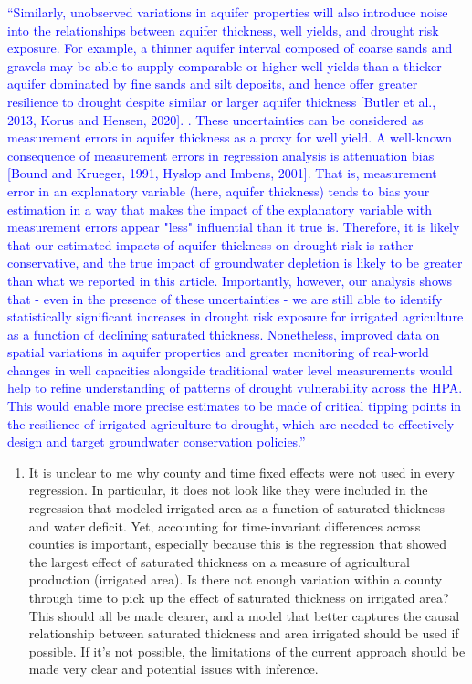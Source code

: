 \documentclass[
]{article}
\providecommand{\tightlist}{%
  \setlength{\itemsep}{0pt}\setlength{\parskip}{0pt}}
\begin{document}
\textcolor{blue}{``Similarly, unobserved variations in aquifer properties will also introduce noise into the relationships between aquifer thickness, well yields, and drought risk exposure. For example, a thinner aquifer interval composed of coarse sands and gravels may be able to supply comparable or higher well yields than a thicker aquifer dominated by fine sands and silt deposits, and hence offer greater resilience to drought despite similar or larger aquifer thickness [Butler et al., 2013, Korus and Hensen, 2020]. . These uncertainties can be considered as measurement errors in aquifer thickness as a proxy for well yield. A well-known consequence of measurement errors in regression analysis is attenuation bias [Bound and Krueger, 1991, Hyslop and Imbens, 2001]. That is, measurement error in an explanatory variable (here, aquifer thickness) tends to bias your estimation in a way that makes the impact of the explanatory variable with measurement errors appear "less" influential than it true is. Therefore, it is likely that our estimated impacts of aquifer thickness on drought risk is rather conservative, and the true impact of groundwater depletion is likely to be greater than what we reported in this article. Importantly, however, our analysis shows that - even in the presence of these uncertainties - we are still able to identify statistically significant increases in drought risk exposure for irrigated agriculture as a function of declining saturated thickness. Nonetheless, improved data on spatial variations in aquifer properties and greater monitoring of real-world changes in well capacities alongside traditional water level measurements would help to refine understanding of patterns of drought vulnerability across the HPA. This would enable more precise estimates to be made of critical tipping points in the resilience of irrigated agriculture to drought, which are needed to effectively design and target groundwater conservation policies.''}

\begin{enumerate}
\def\labelenumi{\arabic{enumi}.}
\setcounter{enumi}{2}
\tightlist
\item
  It is unclear to me why county and time fixed effects were not used in
  every regression. In particular, it does not look like they were
  included in the regression that modeled irrigated area as a function
  of saturated thickness and water deficit. Yet, accounting for
  time-invariant differences across counties is important, especially
  because this is the regression that showed the largest effect of
  saturated thickness on a measure of agricultural production (irrigated
  area). Is there not enough variation within a county through time to
  pick up the effect of saturated thickness on irrigated area? This
  should all be made clearer, and a model that better captures the
  causal relationship between saturated thickness and area irrigated
  should be used if possible. If it's not possible, the limitations of
  the current approach should be made very clear and potential issues
  with inference.
\end{enumerate}
\end{document}
